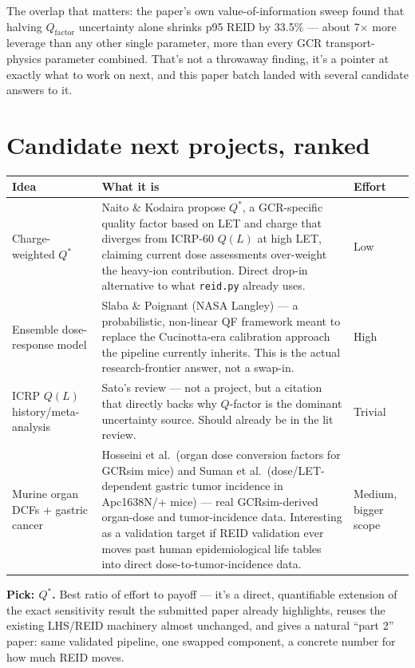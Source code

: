 \documentclass[12pt]{article}
\begin{document}
The overlap that matters: the paper's own value-of-information sweep found
that halving $Q_{\text{factor}}$ uncertainty alone shrinks p95 REID by
33.5\% --- about 7$\times$ more leverage than any other single parameter,
more than every GCR transport-physics parameter combined. That's not a
throwaway finding, it's a pointer at exactly what to work on next, and this
paper batch landed with several candidate answers to it.

\section{Candidate next projects, ranked}

\begin{center}
\begin{tabularx}{\textwidth}{
  >{\raggedright\arraybackslash}p{3.1cm}
  >{\raggedright\arraybackslash}X
  >{\raggedright\arraybackslash}p{1.9cm}
}
\toprule
\textbf{Idea} & \textbf{What it is} & \textbf{Effort} \\
\midrule
Charge-weighted $Q^*$ &
Naito \& Kodaira propose $Q^*$, a GCR-specific quality factor based on LET
and charge that diverges from ICRP-60 $Q(L)$ at high LET, claiming current
dose assessments over-weight the heavy-ion contribution. Direct drop-in
alternative to what \texttt{reid.py} already uses. &
Low \\[6pt]
Ensemble dose-response model &
Slaba \& Poignant (NASA Langley) --- a probabilistic, non-linear QF
framework meant to replace the Cucinotta-era calibration approach the
pipeline currently inherits. This is the actual research-frontier answer,
not a swap-in. &
High \\[6pt]
ICRP $Q(L)$ history/meta-analysis &
Sato's review --- not a project, but a citation that directly backs why
$Q$-factor is the dominant uncertainty source. Should already be in the
lit review. &
Trivial \\[6pt]
Murine organ DCFs + gastric cancer &
Hosseini et al.\ (organ dose conversion factors for GCRsim mice) and Suman
et al.\ (dose/LET-dependent gastric tumor incidence in
Apc1638N/+ mice) --- real GCRsim-derived organ-dose and tumor-incidence
data. Interesting as a validation target if REID validation ever moves
past human epidemiological life tables into direct dose-to-tumor-incidence
data. &
Medium, bigger scope \\
\bottomrule
\end{tabularx}
\end{center}

\textbf{Pick: $Q^*$.} Best ratio of effort to payoff --- it's a direct,
quantifiable extension of the exact sensitivity result the submitted paper
already highlights, reuses the existing LHS/REID machinery almost
unchanged, and gives a natural ``part 2'' paper: same validated pipeline,
one swapped component, a concrete number for how much REID moves.
\end{document}
